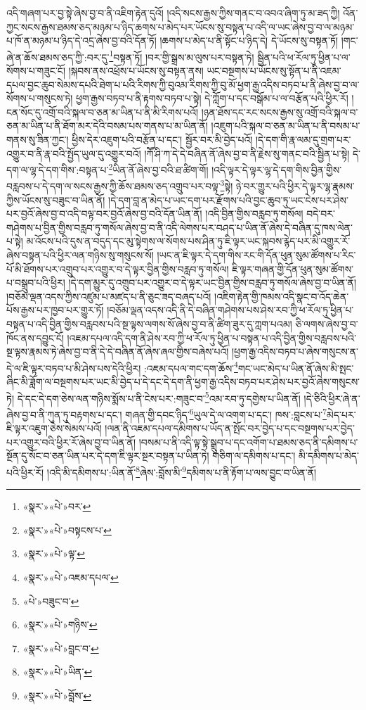 འདི་གཞག་པར་བྱ་སྟེ་ཞེས་བྱ་བ་ནི་འཇིག་རྟེན་དུའོ། །འདི་སངས་རྒྱས་ཀྱིས་གནང་བ་འབའ་ཞིག་ཏུ་མ་ཟད་ཀྱི། འོན་ཀྱང་སངས་རྒྱས་ཐམས་ཅད་མཉམ་པ་ཉིད་ཆགས་པ་མེད་པར་ཡོངས་སུ་བསྟན་པ་འདི་ལ་ཡང་ཞེས་བྱ་བ་ལ་མཉམ་པ་ཁོ་ན་མཉམ་པ་ཉིད་དེ་འདྲ་ཞེས་བྱ་བའི་དོན་ཏོ། །ཆགས་པ་མེད་པ་ནི་སྟོང་པ་ཉིད་དེ། དེ་ཡོངས་སུ་བསྟན་ཏོ། །གང་ཞེ་ན་ཆོས་ཐམས་ཅད་ཀྱི་:བར་དུ་\footnote{«སྣར་»«པེ་»བར་}བསྟན་ཏོ། །བར་གྱི་སྒྲས་མ་ལུས་པར་བསྟན་ཏེ། སྦྱིན་པའི་ཕ་རོལ་ཏུ་ཕྱིན་པ་ལ་སོགས་པ་གཟུང་ངོ། །སྐབས་ནས་འཕྲོས་པ་ཡོངས་སུ་བསྟན་ནས། ཡང་བསྔགས་པ་ཡོངས་སུ་སྟོན་པ་ནི་འཇམ་དཔལ་བྱང་ཆུབ་སེམས་དཔའི་ཐེག་པ་པའི་རིགས་ཀྱི་བུའམ་རིགས་ཀྱི་བུ་མོ་ཕྱག་རྒྱ་འདིས་བཏབ་པ་ནི་ཞེས་བྱ་བ་ལ་སོགས་པ་གསུངས་ཏེ། ཕྱག་རྒྱས་བཏབ་པ་ནི་རྟགས་བཏབ་པ་སྟེ། དེ་ཀློག་པ་དང་བསྒོམ་པ་ལ་བརྩོན་པའི་ཕྱིར་རོ། །ངན་སོང་དུ་འགྲོ་བའི་སྐལ་བ་ཅན་མ་ཡིན་པ་ནི་མི་རིགས་པའོ། །ཉན་ཐོས་དང་རང་སངས་རྒྱས་སུ་འགྲོ་བའི་སྐལ་བ་ཅན་མ་ཡིན་པ་ནི་ཐོག་མར་དེའི་བསམ་པས་གནས་པ་མ་ཡིན་ནོ། །འཇུག་པའི་སྐལ་བ་ཅན་མ་ཡིན་པ་ནི་བསམ་པ་གནས་སུ་ཟིན་ཀྱང་། ཕྱིས་དེར་འཇུག་པའི་བརྩོན་པ་དང་། སྦྱོར་བར་མི་བྱེད་པའོ། །དེ་དག་གི་རྣ་ལམ་དུ་གྲག་པར་འགྱུར་བ་ནི་རྣ་བའི་སྤྱོད་ཡུལ་དུ་འགྱུར་བའོ། །ཀཽ་ཤི་ཀ་དེ་དེ་བཞིན་ནོ་ཞེས་བྱ་བ་ནི་རྗེས་སུ་གནང་བའི་སྦྱིན་པ་སྟེ། དེ་དག་ལ་ལྷ་དེ་དག་གིས་:བསྟན་པ་\footnote{«སྣར་»«པེ་»བསྟངས་པ་}ཡིན་ནོ་ཞེས་བྱ་བའི་ཐ་ཚིག་གོ། །འདི་ལྟར་དེ་ལྟར་ལྷ་དེ་དག་གིས་བྱིན་གྱིས་བརླབས་པ་དེ་དག་ལ་སངས་རྒྱས་ཀྱི་ཆོས་ཐམས་ཅད་འགྲུབ་པར་བལྟ་\footnote{«སྣར་»«པེ་»ལྟ་}སྟེ། ཉེ་བར་གྱུར་པའི་ཕྱིར་དེ་ལྟར་ལྷ་རྣམས་ཀྱིས་ཡོངས་སུ་བཟུང་བ་ཡིན་ནོ། །དེ་དག་བླ་ན་མེད་པ་ཡང་དག་པར་རྫོགས་པའི་བྱང་ཆུབ་ཏུ་ཡང་ངེས་པར་ཤེས་པར་བྱའོ་ཞེས་བྱ་བ་འདི་བལྟ་བར་བྱའོ་ཞེས་བྱ་བའི་དོན་ཡིན་ནོ། །འདི་བྱིན་གྱིས་བརླབ་ཏུ་གསོལ། བདེ་བར་གཤེགས་པ་བྱིན་གྱིས་བརླབ་ཏུ་གསོལ་ཞེས་བྱ་བ་ནི་འདི་ལེགས་པར་བཤད་པ་ཡིན་ནོ་ཞེས་དེ་བཞིན་དུ་ཁས་ལེན་པ་སྟེ། མ་འོངས་པའི་དུས་ན་བདུད་དང་མུ་སྟེགས་ལ་སོགས་པས་ཤིན་ཏུ་ཇི་ལྟར་ཡང་སྐབས་རྙེད་པར་མི་འགྱུར་རོ་ཞེས་བསྟན་པའི་ཕྱིར་ལན་གཉིས་སུ་གསུངས་སོ། །ཡང་ན་ཇི་ལྟར་དེ་དག་གིས་རང་གི་དོན་ཕུན་སུམ་ཚོགས་པ་རིང་པོ་མི་ཐོགས་པར་འགྲུབ་པར་འགྱུར་བ་དེ་ལྟར་བྱིན་གྱིས་བརླབ་ཏུ་གསོལ། ཇི་ལྟར་གཞན་གྱི་དོན་ཕུན་སུམ་ཚོགས་པ་བསྒྲུབ་པའི་ཕྱིར། །དེ་དག་མྱུར་དུ་འགྲུབ་པར་འགྱུར་བ་དེ་ལྟར་ཡང་བྱིན་གྱིས་བརླབ་ཏུ་གསོལ་ཞེས་བྱ་བ་ཡིན་ནོ། །བཅོམ་ལྡན་འདས་ཀྱིས་འཛུམ་པ་མཛད་པ་ནི་ཅུང་ཟད་བཞད་པའོ། །འཇིག་རྟེན་གྱི་ཁམས་འདི་སྣང་བ་འོད་ཆེན་པོས་རྒྱས་པར་ཁྱབ་པར་གྱུར་ཏོ། །བཅོམ་ལྡན་འདས་འདི་ནི་དེ་བཞིན་གཤེགས་པས་ཤེས་རབ་ཀྱི་ཕ་རོལ་ཏུ་ཕྱིན་པ་བསྟན་པ་འདི་བྱིན་གྱིས་བརླབས་པའི་སྔ་ལྟས་ལགས་སོ་ཞེས་བྱ་བ་ནི་ཚིག་ཟུར་དུ་ཀླག་པའམ། ཅི་ལགས་ཞེས་བྱ་བ་ཁོང་ནས་དབྱུང་ངོ། །འཇམ་དཔལ་འདི་དག་ནི་ཤེས་རབ་ཀྱི་ཕ་རོལ་ཏུ་ཕྱིན་པ་བསྟན་པ་འདི་བྱིན་གྱིས་བརླབས་པའི་སྔ་ལྟས་རྣམས་ཏེ་ཞེས་བྱ་བ་ནི་དེ་དེ་བཞིན་ནོ་ཞེས་ཞལ་གྱིས་བཞེས་པའོ། །ཕྱག་རྒྱ་འདིས་བཏབ་པ་ཞེས་གསུངས་ན་དེ་ལ་ཇི་ལྟར་བཏབ་པ་མི་ཤེས་པས་དེའི་ཕྱིར། :འཇམ་དཔལ་གང་དག་ཆོས་\footnote{«སྣར་»«པེ་»འཇམ་དཔལ་}གང་ཡང་མེད་པ་ཡིན་ནོ་ཞེས་མི་སྤང་ཞིང་མི་ཟློག་ལ་བསྔགས་པར་ཡང་མི་བྱེད་པ་དེ་དང་དེ་དག་ནི་ཕྱག་རྒྱ་འདིས་བཏབ་པར་ཤེས་པར་བྱའོ་ཞེས་གསུངས་ཏེ། དེ་དང་དེ་དག་ཅེས་ལན་གཉིས་སྨོས་པ་ནི་ངེས་པར་:གཟུང་བ་\footnote{«པེ་»བཟུང་བ་}འམ་རབ་ཏུ་དགྱེས་པ་ཡིན་ནོ། །དེ་ཅིའི་ཕྱིར་ཞེ་ན་ཞེས་བྱ་བ་ནི་ཀུན་ཏུ་བརྟགས་པ་དང་། གཞན་གྱི་དབང་ཉིད་\footnote{«སྣར་»«པེ་»གཉིས་}ཡུལ་དེ་ལ་འགག་པ་དང་། ཁས་:བླངས་པ་\footnote{«སྣར་»«པེ་»བླང་བ་}མེད་པར་ཇི་ལྟར་འཇུག་ཅེས་སེམས་པའོ། །ལན་ནི་འཇམ་དཔལ་དམིགས་པ་ཡོད་ན་སྤོང་བར་བྱེད་པ་དང་བསྔགས་པར་བྱེད་པར་འགྱུར་བའི་ཕྱིར་རོ་ཞེས་བྱ་བ་ཡིན་ནོ། །བསམ་པ་ནི་འདི་ལྟ་སྟེ་སྒྲུབ་པ་དང་འགོག་པ་ཐམས་ཅད་ནི་དམིགས་པ་སྔོན་དུ་སོང་བ་ཅན་ཡིན་པར་དེ་དག་ཇི་ལྟར་སྔར་བསྟན་པ་ཡིན་ཏེ། གཅིག་ལ་དམིགས་པ་དང་། མི་དམིགས་པ་མེད་པའི་ཕྱིར་རོ། །འདི་མི་དམིགས་པ་:ཡིན་ནོ་\footnote{«སྣར་»«པེ་»ཡིན་}ཞེས་:བློས་མི་\footnote{«སྣར་»«པེ་»བློས་}དམིགས་པ་ནི་རྟོག་པ་ལས་བྱུང་བ་ཡིན་ནོ། 